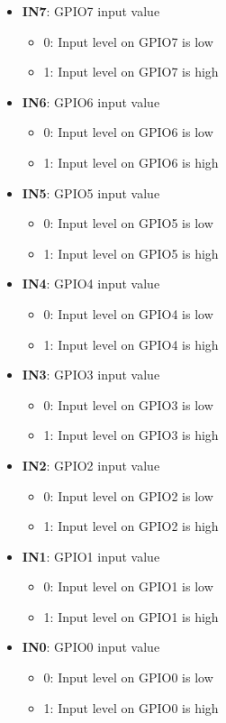 \documentclass{article}
\begin{document}
		\begin{itemize}
			\item \textbf{IN7}: GPIO7 input value
			\begin{itemize}
				\item 0: Input level on GPIO7 is low
				\item 1: Input level on GPIO7 is high
			\end{itemize}
			\item \textbf{IN6}: GPIO6 input value
			\begin{itemize}
				\item 0: Input level on GPIO6 is low
				\item 1: Input level on GPIO6 is high
			\end{itemize}
			\item \textbf{IN5}: GPIO5 input value
			\begin{itemize}
				\item 0: Input level on GPIO5 is low
				\item 1: Input level on GPIO5 is high
			\end{itemize}
			\item \textbf{IN4}: GPIO4 input value
			\begin{itemize}
				\item 0: Input level on GPIO4 is low
				\item 1: Input level on GPIO4 is high
			\end{itemize}
			\item \textbf{IN3}: GPIO3 input value
			\begin{itemize}
				\item 0: Input level on GPIO3 is low
				\item 1: Input level on GPIO3 is high
			\end{itemize}
			\item \textbf{IN2}: GPIO2 input value
			\begin{itemize}
				\item 0: Input level on GPIO2 is low
				\item 1: Input level on GPIO2 is high
			\end{itemize}
			\item \textbf{IN1}: GPIO1 input value
			\begin{itemize}
				\item 0: Input level on GPIO1 is low
				\item 1: Input level on GPIO1 is high
			\end{itemize}
			\item \textbf{IN0}: GPIO0 input value
			\begin{itemize}
				\item 0: Input level on GPIO0 is low
				\item 1: Input level on GPIO0 is high
			\end{itemize}
		\end{itemize}
\end{document}
